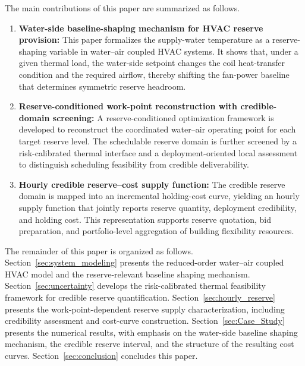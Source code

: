\documentclass[journal]{IEEEtran}
\theoremstyle{remark}
\begin{document}
	The main contributions of this paper are summarized as follows.
	\begin{enumerate}
		\item \textbf{Water-side baseline-shaping mechanism for HVAC reserve provision:} 
		This paper formalizes the supply-water temperature as a reserve-shaping variable in water--air coupled HVAC systems. It shows that, under a given thermal load, the water-side setpoint changes the coil heat-transfer condition and the required airflow, thereby shifting the fan-power baseline that determines symmetric reserve headroom.
		
		\item \textbf{Reserve-conditioned work-point reconstruction with credible-domain screening:} 
		A reserve-conditioned optimization framework is developed to reconstruct the coordinated water--air operating point for each target reserve level. The schedulable reserve domain is further screened by a risk-calibrated thermal interface and a deployment-oriented local assessment to distinguish scheduling feasibility from credible deliverability.
		
		\item \textbf{Hourly credible reserve--cost supply function:} 
		The credible reserve domain is mapped into an incremental holding-cost curve, yielding an hourly supply function that jointly reports reserve quantity, deployment credibility, and holding cost. This representation supports reserve quotation, bid preparation, and portfolio-level aggregation of building flexibility resources.
	\end{enumerate}
	
	The remainder of this paper is organized as follows. Section~\ref{sec:system_modeling} presents the reduced-order water--air coupled HVAC model and the reserve-relevant baseline shaping mechanism. Section~\ref{sec:uncertainty} develops the risk-calibrated thermal feasibility framework for credible reserve quantification. Section~\ref{sec:hourly_reserve} presents the work-point-dependent reserve supply characterization, including credibility assessment and cost-curve construction. Section~\ref{sec:Case_Study} presents the numerical results, with emphasis on the water-side baseline shaping mechanism, the credible reserve interval, and the structure of the resulting cost curves. Section~\ref{sec:conclusion} concludes this paper.
	
	
\end{document}
